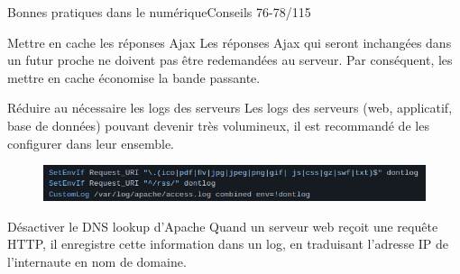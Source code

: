 \begin{frame}{Bonnes pratiques dans le numérique}{Conseils 76-78/115}
\begin{block}{Mettre en cache les réponses Ajax}
Les réponses Ajax qui seront inchangées dans un futur proche ne doivent pas être redemandées au serveur. Par conséquent, les mettre en cache économise la bande passante.
\end{block}

\begin{block}{Réduire au nécessaire les logs des serveurs}
Les logs des serveurs (web, applicatif, base de données) pouvant devenir très volumineux, il est recommandé de les configurer dans leur ensemble.
\begin{figure}
    \includegraphics[scale=0.4]{chapitre2/wdd7/fig/c2.png}
\end{figure}
\end{block}

\begin{block}{Désactiver le DNS lookup d’Apache}
Quand un serveur web reçoit une requête HTTP, il enregistre cette information dans un log, en traduisant l’adresse IP de l’internaute en nom de domaine. 
\end{block}

\end{frame}


